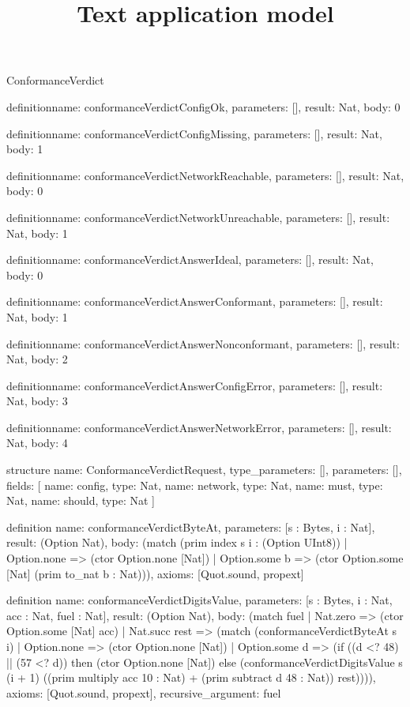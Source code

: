\begin{lexlean}{ConformanceVerdict}
\title{Text application model}
\begin{semanticmodule}
definition{name: conformanceVerdictConfigOk, parameters: [], result: Nat, body: 0}

definition{name: conformanceVerdictConfigMissing, parameters: [], result: Nat, body: 1}

definition{name: conformanceVerdictNetworkReachable, parameters: [], result: Nat, body: 0}

definition{name: conformanceVerdictNetworkUnreachable, parameters: [], result: Nat, body: 1}

definition{name: conformanceVerdictAnswerIdeal, parameters: [], result: Nat, body: 0}

definition{name: conformanceVerdictAnswerConformant, parameters: [], result: Nat, body: 1}

definition{name: conformanceVerdictAnswerNonconformant, parameters: [], result: Nat, body: 2}

definition{name: conformanceVerdictAnswerConfigError, parameters: [], result: Nat, body: 3}

definition{name: conformanceVerdictAnswerNetworkError, parameters: [], result: Nat, body: 4}

structure{
  name: ConformanceVerdictRequest,
  type_parameters: [],
  parameters: [],
  fields: [
    {name: config, type: Nat},
    {name: network, type: Nat},
    {name: must, type: Nat},
    {name: should, type: Nat}
  ]
}

definition{
  name: conformanceVerdictByteAt,
  parameters: [s : Bytes, i : Nat],
  result: (Option Nat),
  body: (match (prim index s i : (Option UInt8))
    | Option.none => (ctor Option.none [Nat])
    | Option.some b => (ctor Option.some [Nat] (prim to_nat b : Nat))),
  axioms: [Quot.sound, propext]
}

definition{
  name: conformanceVerdictDigitsValue,
  parameters: [s : Bytes, i : Nat, acc : Nat, fuel : Nat],
  result: (Option Nat),
  body: (match fuel
    | Nat.zero => (ctor Option.some [Nat] acc)
    | Nat.succ rest => (match (conformanceVerdictByteAt s i)
      | Option.none => (ctor Option.none [Nat])
      | Option.some d => (if ((d <? 48) || (57 <? d)) then (ctor Option.none [Nat]) else (conformanceVerdictDigitsValue s (i + 1) ((prim multiply acc 10 : Nat) + (prim subtract d 48 : Nat)) rest)))),
  axioms: [Quot.sound, propext],
  recursive_argument: fuel
}


\end{semanticmodule}
\end{lexlean}
